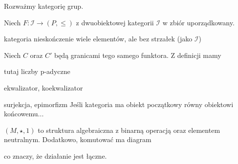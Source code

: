 \begin{example}[m]
\item 


  \item Rozważmy kategorię grup. 
    \begin{center}
    \end{center}
    \begin{center}
    \end{center}
  \item Niech $F:\mathcal{I}\to (P, \leq)$ z dwuobiektowej kategorii $\mathcal{I}$ w zbiór uporządkowany.
\end{example}

kategoria nieskończenie wiele elementów, ale bez strzałek (jako $\mathcal{I}$)
 

Niech $C$ oraz $C'$ będą granicami tego samego funktora. Z definicji mamy
\begin{center}
\end{center}

tutaj liczby p-adyczne

ekwalizator, koekwalizator

\begin{definition}{surjekcja, epimorfizm}{}
  Jeśli kategoria ma obiekt początkowy równy obiektowi końcowemu...
\end{definition}

 $(M, \star, 1)$ to struktura algebraiczna z binarną operacją oraz elementem neutralnym. Dodatkowo, komutować ma diagram 
\begin{center}
\end{center}
co znaczy, że działanie jest łączne.

